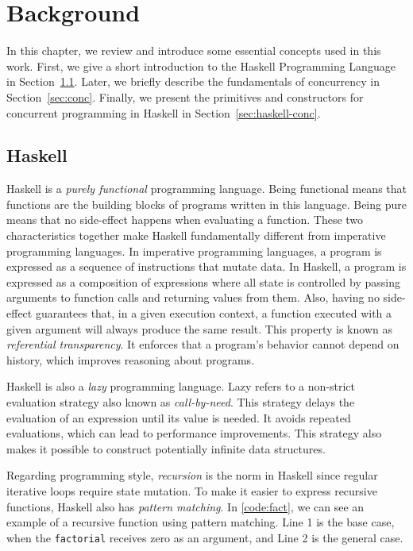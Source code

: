 \chapter{Background}\label{chp:background}
In this chapter, we review and introduce some essential concepts used in this work. First, we give a short introduction to the Haskell Programming Language in Section~\ref{sec:haskell}. Later, we briefly describe the fundamentals of concurrency in Section~\ref{sec:conc}. Finally, we present the primitives and constructors for concurrent programming in Haskell in Section~\ref{sec:haskell-conc}.

\section{Haskell}\label{sec:haskell}
Haskell is a \emph{purely functional} programming language. Being functional means that functions are the building blocks of programs written in this language. Being pure means that no side-effect happens when evaluating a function. These two characteristics together make Haskell fundamentally different from imperative programming languages. In imperative programming languages, a program is expressed as a sequence of instructions that mutate data. In Haskell, a program is expressed as a composition of expressions where all state is controlled by passing arguments to function calls and returning values from them. Also, having no side-effect guarantees that, in a given execution context, a function executed with a given argument will always produce the same result. This property is known as \emph{referential transparency}. It enforces that a program's behavior cannot depend on history, which improves reasoning about programs.

Haskell is also a \emph{lazy} programming language. Lazy refers to a non-strict evaluation strategy also known as \emph{call-by-need}. This strategy delays the evaluation of an expression until its value is needed. It avoids repeated evaluations, which can lead to performance improvements. This strategy also makes it possible to construct potentially infinite data structures.

Regarding programming style, \emph{recursion} is the norm in Haskell since regular iterative loops require state mutation. To make it easier to express recursive functions, Haskell also has \emph{pattern matching}. In \autoref{code:fact}, we can see an example of a recursive function using pattern matching. Line 1 is the base case, when the \texttt{factorial} receives zero as an argument, and Line 2 is the general case.

